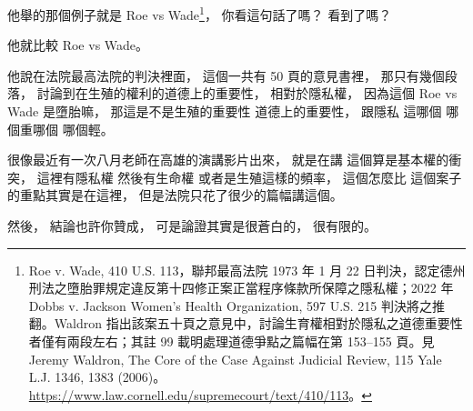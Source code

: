 \hypertarget{w06:cue:2600}{}他舉的那個例子就是 Roe vs Wade\footnote{Roe v. Wade, 410 U.S. 113，聯邦最高法院 1973 年 1 月 22 日判決，認定德州刑法之墮胎罪規定違反第十四修正案正當程序條款所保障之隱私權；2022 年 Dobbs v. Jackson Women's Health Organization, 597 U.S. 215 判決將之推翻。Waldron 指出該案五十頁之意見中，討論生育權相對於隱私之道德重要性者僅有兩段左右；其註 99 載明處理道德爭點之篇幅在第 153–155 頁。見 Jeremy Waldron, The Core of the Case Against Judicial Review, 115 Yale L.J. 1346, 1383 (2006)。\url{https://www.law.cornell.edu/supremecourt/text/410/113}。}，
\hypertarget{w06:cue:2601}{}你看這句話了嗎？
\hypertarget{w06:cue:2602}{}看到了嗎？

\hypertarget{w06:cue:2603}{}他就比較 Roe vs Wade。

\hypertarget{w06:cue:2604}{}他說在法院最高法院的判決裡面，
\hypertarget{w06:cue:2605}{}這個一共有 50 頁的意見書裡，
\hypertarget{w06:cue:2606}{}那只有幾個段落，
\hypertarget{w06:cue:2607}{}討論到在生殖的權利的道德上的重要性，
\hypertarget{w06:cue:2608}{}相對於隱私權，
\hypertarget{w06:cue:2609}{}因為這個 Roe vs Wade 是墮胎嘛，
\hypertarget{w06:cue:2610}{}那這是不是生殖的重要性 道德上的重要性，
\hypertarget{w06:cue:2611}{}跟隱私 這哪個 哪個重哪個 哪個輕。

\hypertarget{w06:cue:2612}{}很像最近有一次八月老師在高雄的演講影片出來，
\hypertarget{w06:cue:2613}{}就是在講 這個算是基本權的衝突，
\hypertarget{w06:cue:2614}{}這裡有隱私權 然後有生命權 或者是生殖這樣的頻率，
\hypertarget{w06:cue:2615}{}這個怎麼比 這個案子的重點其實是在這裡，
\hypertarget{w06:cue:2616}{}但是法院只花了很少的篇幅講這個。

\hypertarget{w06:cue:2617}{}然後，
\hypertarget{w06:cue:2618}{}結論也許你贊成，
\hypertarget{w06:cue:2619}{}可是論證其實是很蒼白的，
\hypertarget{w06:cue:2620}{}很有限的。

